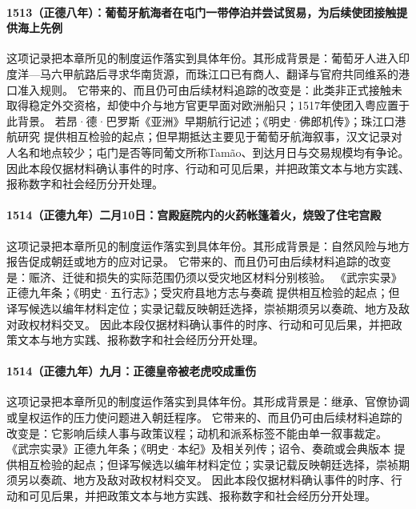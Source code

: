 \paragraph{1513（正德八年）：葡萄牙航海者在屯门一带停泊并尝试贸易，为后续使团接触提供海上先例} 这项记录把本章所见的制度运作落实到具体年份。其形成背景是：葡萄牙人进入印度洋—马六甲航路后寻求华南货源，而珠江口已有商人、翻译与官府共同维系的港口准入规则。 它带来的、而且仍可由后续材料追踪的改变是：此类非正式接触未取得稳定外交资格，却使中介与地方官更早面对欧洲船只；1517年使团入粤应置于此背景。 若昂·德·巴罗斯《亚洲》早期航行记述；《明史·佛郎机传》；珠江口港航研究 提供相互检验的起点；但早期抵达主要见于葡萄牙航海叙事，汉文记录对人名和地点较少；屯门是否等同葡文所称Tamão、到达月日与交易规模均有争论。 因此本段仅据材料确认事件的时序、行动和可见后果，并把政策文本与地方实践、报称数字和社会经历分开处理。

\paragraph{1514（正德九年）二月10日：宫殿庭院内的火药帐篷着火，烧毁了住宅宫殿} 这项记录把本章所见的制度运作落实到具体年份。其形成背景是：自然风险与地方报告促成朝廷或地方的应对记录。 它带来的、而且仍可由后续材料追踪的改变是：赈济、迁徙和损失的实际范围仍须以受灾地区材料分别核验。 《武宗实录》正德九年条；《明史·五行志》；受灾府县地方志与奏疏 提供相互检验的起点；但译写候选以编年材料定位；实录记载反映朝廷选择，崇祯期须另以奏疏、地方及敌对政权材料交叉。 因此本段仅据材料确认事件的时序、行动和可见后果，并把政策文本与地方实践、报称数字和社会经历分开处理。

\paragraph{1514（正德九年）九月：正德皇帝被老虎咬成重伤} 这项记录把本章所见的制度运作落实到具体年份。其形成背景是：继承、官僚协调或皇权运作的压力使问题进入朝廷程序。 它带来的、而且仍可由后续材料追踪的改变是：它影响后续人事与政策议程；动机和派系标签不能由单一叙事裁定。 《武宗实录》正德九年条；《明史·本纪》及相关列传；诏令、奏疏或会典版本 提供相互检验的起点；但译写候选以编年材料定位；实录记载反映朝廷选择，崇祯期须另以奏疏、地方及敌对政权材料交叉。 因此本段仅据材料确认事件的时序、行动和可见后果，并把政策文本与地方实践、报称数字和社会经历分开处理。

